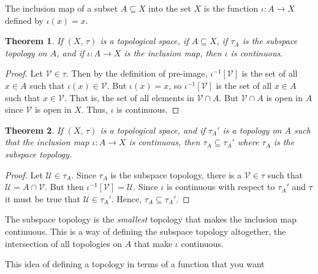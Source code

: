 \documentclass{article}
\theoremstyle{plain}
\newtheorem{theorem}{Theorem}[section]
\theoremstyle{normal}
\newenvironment{definition}{%
    \pushQED{\qed}\renewcommand{\qedsymbol}{$\blacksquare$}\definitionx%
}{%
    \popQED\enddefinitionx%
}
\begin{document}
        \begin{definition}[\textbf{Inclusion Map}]
            The inclusion map of a subset $A\subseteq{X}$ into the set $X$
            is the function $\iota:A\rightarrow{X}$ defined by $\iota(x)=x$.
        \end{definition}
        \begin{theorem}
            If $(X,\,\tau)$ is a topological space, if $A\subseteq{X}$, if
            $\tau_{A}$ is the subspace topology on $A$, and if
            $\iota:A\rightarrow{X}$ is the inclusion map, then $\iota$ is
            continuous.
        \end{theorem}
        \begin{proof}
            Let $\mathcal{V}\in\tau$. Then by the definition of pre-image,
            $\iota^{-1}[\mathcal{V}]$ is the set of all $x\in{A}$ such that
            $\iota(x)\in\mathcal{V}$. But $\iota(x)=x$, so
            $\iota^{-1}[\mathcal{V}]$ is the set of all $x\in{A}$ such that
            $x\in\mathcal{V}$. That is, the set of all elements in
            $\mathcal{V}\cap{A}$. But $\mathcal{V}\cap{A}$ is open in $A$ since
            $\mathcal{V}$ is open in $X$. Thus, $\iota$ is continuous.
        \end{proof}
        \begin{theorem}
            If $(X,\,\tau)$ is a topological space, and if $\tau_{A}'$ is a
            topology on $A$ such that the inclusion map $\iota:A\rightarrow{X}$
            is continuous, then $\tau_{A}\subseteq\tau_{A}'$ where
            $\tau_{A}$ is the subspace topology.
        \end{theorem}
        \begin{proof}
            Let $\mathcal{U}\in\tau_{A}$. Since $\tau_{A}$ is the subspace
            topology, there is a $\mathcal{V}\in\tau$ such that
            $\mathcal{U}=A\cap\mathcal{V}$. But then
            $\iota^{-1}[\mathcal{V}]=\mathcal{U}$. Since $\iota$ is continuous
            with respect to $\tau_{A}'$ and $\tau$ it must be true that
            $\mathcal{U}\in\tau_{A}'$. Hence, $\tau_{A}\subseteq\tau_{A}'$.
        \end{proof}
        The subspace topology is the \textit{smallest} topology that makes
        the inclusion map continuous. This is a way of defining the subspace
        topology altogether, the intersection of all topologies on $A$ that
        make $\iota$ continuous.
        \par\hfill\par
        This idea of defining a topology in terms of a function that you want
\end{document}
